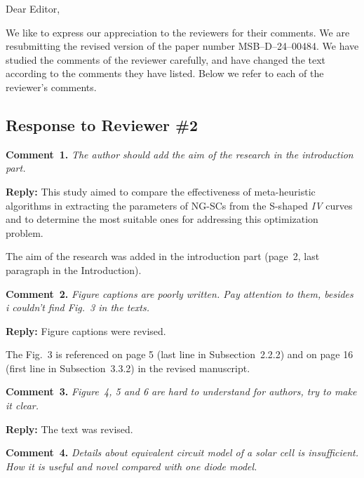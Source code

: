 \documentclass[a4paper,fleqn]{cas-sc}
\begin{document}
\shorttitle{}


Dear Editor,

We like to express our appreciation to the reviewers for their comments.
We are resubmitting the revised version of the paper number MSB--D--24--00484.
We have studied the comments of the reviewer carefully, and have changed the text according to the comments they
have listed.
Below we refer to each of the reviewer’s comments.


\subsection*{Response to Reviewer \#2 }

\noindent
\textcolor[rgb]{0.00,0.50,1.00}{\textbf{Comment~1.}}
\emph{The author should add the aim of the research in the introduction part.}

\noindent
\textcolor[rgb]{0.51,0.00,0.00}{\textbf{Reply:}}
This study aimed to compare the effectiveness of meta-heuristic algorithms in extracting the parameters of NG-SCs from the S-shaped \emph{IV} curves
and to determine the most suitable ones for addressing this optimization problem.

The aim of the research was added in the introduction part (page~2, last paragraph in the Introduction).


\vspace{1cm}
\noindent
\textcolor[rgb]{0.00,0.50,1.00}{\textbf{Comment~2.}}
\emph{Figure captions are poorly written. Pay attention to them, besides i couldn't find Fig.~3 in the texts.}

\noindent
\textcolor[rgb]{0.51,0.00,0.00}{\textbf{Reply:}}
Figure captions were revised.

The Fig.~3 is referenced on page 5 (last line in Subsection~2.2.2) and on page 16 (first line in Subsection~3.3.2)
in the revised manuscript.


\vspace{1cm}
\noindent
\textcolor[rgb]{0.00,0.50,1.00}{\textbf{Comment~3.}}
\emph{Figure~4, 5 and 6 are hard to understand for authors, try to make it clear.}

\noindent
\textcolor[rgb]{0.51,0.00,0.00}{\textbf{Reply:}}
The text was revised.

\vspace{1cm}
\noindent
\textcolor[rgb]{0.00,0.50,1.00}{\textbf{Comment~4.}}
\emph{Details about equivalent circuit model of a solar cell is insufficient.
How it is useful and novel compared with one diode model.}
\end{document}
